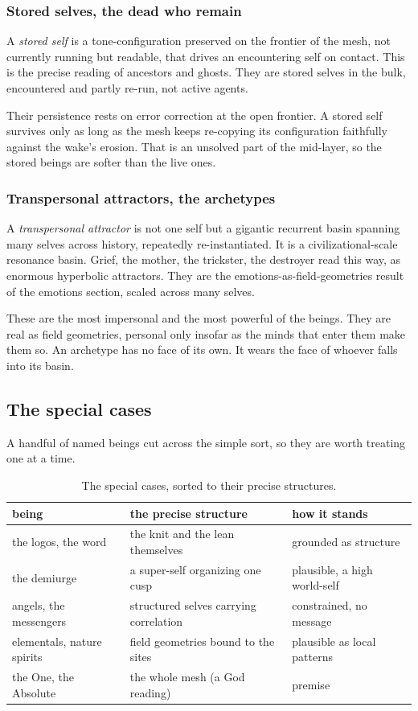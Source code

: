 \subsubsection{Stored selves, the dead who remain}

A \emph{stored self} is a tone-configuration preserved on the frontier of the mesh, not currently running but readable, that drives an encountering self on contact. This is the precise reading of ancestors and ghosts. They are stored selves in the bulk, encountered and partly re-run, not active agents.

Their persistence rests on error correction at the open frontier. A stored self survives only as long as the mesh keeps re-copying its configuration faithfully against the wake's erosion. That is an unsolved part of the mid-layer, so the stored beings are softer than the live ones.

\subsubsection{Transpersonal attractors, the archetypes}

A \emph{transpersonal attractor} is not one self but a gigantic recurrent basin spanning many selves across history, repeatedly re-instantiated. It is a civilizational-scale resonance basin. Grief, the mother, the trickster, the destroyer read this way, as enormous hyperbolic attractors. They are the emotions-as-field-geometries result of the emotions section, scaled across many selves.

These are the most impersonal and the most powerful of the beings. They are real as field geometries, personal only insofar as the minds that enter them make them so. An archetype has no face of its own. It wears the face of whoever falls into its basin.

\subsection{The special cases}

A handful of named beings cut across the simple sort, so they are worth treating one at a time.

\begin{table}[ht]
\centering
\begin{tabular}{@{}lll@{}}
\toprule
being & the precise structure & how it stands \\
\midrule
the logos, the word & the knit and the lean themselves & grounded as structure \\
the demiurge & a super-self organizing one cusp & plausible, a high world-self \\
angels, the messengers & structured selves carrying correlation & constrained, no message \\
elementals, nature spirits & field geometries bound to the sites & plausible as local patterns \\
the One, the Absolute & the whole mesh (a God reading) & premise \\
\bottomrule
\end{tabular}
\caption{The special cases, sorted to their precise structures.}
\label{tab:being-special}
\end{table}

